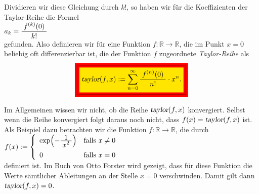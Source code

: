 Dividieren wir diese Gleichung durch $k!$, so haben wir f\"ur die Koeffizienten der Taylor-Reihe die Formel 
\\
\hspace*{1.3cm}
$a_k = \displaystyle\frac{\;\displaystyle f^{(k)}(0)\;}{\;\displaystyle k!\;}$
\\[0.3cm]
gefunden.  Also definieren wir f\"ur eine Funktion $f:\mathbb{R} \rightarrow \mathbb{R}$, die im Punkt $x=0$
beliebig oft differenzierbar ist, die der Funktion $f$ zugeordnete \emph{Taylor-Reihe} als
\begin{equation}
  \label{eq:taylorFormula}
  \colorbox{red}{\framebox{\colorbox{orange}{$\ds \textsl{taylor}(f,x) := \sum\limits_{n=0}^\infty \bruch{f^{(n)}(0)}{n!} \cdot  x^n$.}}}
\end{equation}


\remark
Im Allgemeinen wissen wir nicht, ob die Reihe $\textsl{taylor}(f,x)$ konvergiert.  Selbst
wenn die Reihe konvergiert folgt daraus noch nicht, dass $f(x) = \textsl{taylor}(f,x)$
ist.  Als Beispiel dazu betrachten wir die Funktion $f:\mathbb{R} \rightarrow \mathbb{R}$, die durch
\\[0.2cm]
\hspace*{1.3cm}
$f(x) := \left\{
\begin{array}{ll}
  \exp\Bigl(-\textstyle\frac{\;\textstyle1\;}{\;\textstyle x^2\;}\Bigr)  & \mbox{falls $x \not= 0$} \\[0.3cm]
   0                              & \mbox{falls $x = 0$}
\end{array}
\right.
$
\\[0.2cm]
definiert ist.  Im Buch von Otto Forster \cite{forster:2011} wird gezeigt, dass f\"ur diese Funktion
die Werte s\"amtlicher Ableitungen an der Stelle $x = 0$ verschwinden.   Damit gilt dann
 $\textsl{taylor}(f,x) = 0$.  \eox


